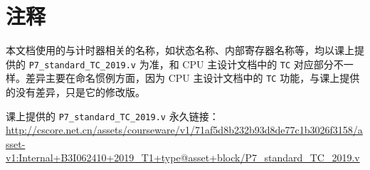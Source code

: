 \documentclass[12pt,AutoFakeBold,AutoFakeSlant]{article}
\newcommand{\ms}[1]{\texttt{#1}}
\begin{document}
\section{注释}

本文档使用的与计时器相关的名称，如状态名称、内部寄存器名称等，均以课上提供的 \ms{P7\_standard\_TC\_2019.v} 为准，和 CPU 主设计文档中的 \ms{TC} 对应部分不一样。差异主要在命名惯例方面，因为 CPU 主设计文档中的 \ms{TC} 功能，与课上提供的没有差异，只是它的修改版。

课上提供的 \ms{P7\_standard\_TC\_2019.v} 永久链接：\url{http://cscore.net.cn/assets/courseware/v1/71af5d8b232b93d8de77c1b3026f3158/asset-v1:Internal+B3I062410+2019_T1+type@asset+block/P7_standard_TC_2019.v}
\end{document}
